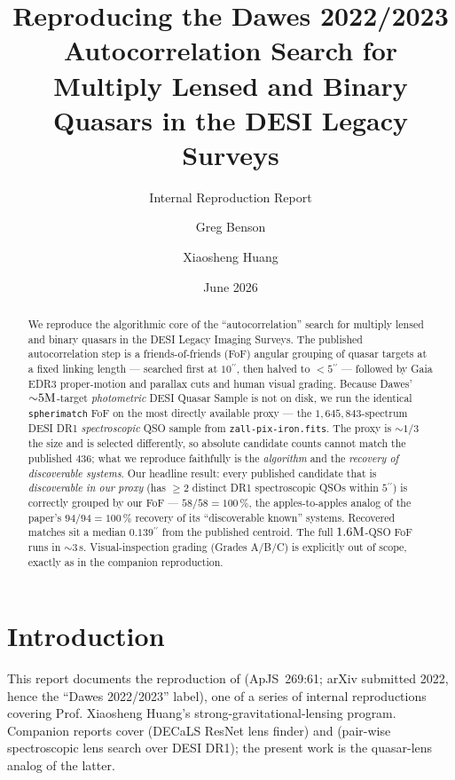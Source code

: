 \documentclass[11pt,letterpaper]{article}
\title{Reproducing the Dawes 2022/2023 Autocorrelation Search for\\
       Multiply Lensed and Binary Quasars in the DESI Legacy Surveys}
\author{Greg Benson \and Xiaosheng Huang}
\date{June 2026}
\newcommand{\asec}{\ensuremath{^{\prime\prime}}}
\begin{document}
\maketitle
\subtitle{Internal Reproduction Report}

\begin{abstract}
We reproduce the algorithmic core of the \citet{dawes2023quasars}
``autocorrelation'' search for multiply lensed and binary quasars in the
DESI Legacy Imaging Surveys. The published autocorrelation step is a
friends-of-friends (FoF) angular grouping of quasar targets at a fixed
linking length --- searched first at $10\asec$, then halved to ${<}5\asec$
--- followed by Gaia EDR3 proper-motion and parallax cuts and human visual
grading. Because Dawes' ${\sim}5{\rm M}$-target \emph{photometric} DESI Quasar
Sample is not on disk, we run the identical \texttt{spherimatch} FoF
\autocite{spherimatch} on the most directly available proxy --- the
$1{,}645{,}843$-spectrum DESI DR1 \emph{spectroscopic} QSO sample from
\texttt{zall-pix-iron.fits}. The proxy is ${\sim}1/3$ the size and is
selected differently, so absolute candidate counts cannot match the
published $436$; what we reproduce faithfully is the \emph{algorithm} and
the \emph{recovery of discoverable systems}. Our headline result: every
published candidate that is \emph{discoverable in our proxy} (has $\geq 2$
distinct DR1 spectroscopic QSOs within $5\asec$) is correctly grouped by
our FoF --- $58/58 = 100\,\%$, the apples-to-apples analog of the paper's
$94/94 = 100\,\%$ recovery of its ``discoverable known'' systems. Recovered
matches sit a median $0.139\asec$ from the published centroid. The full
$1.6{\rm M}$-QSO FoF runs in ${\sim}3$\,s. Visual-inspection grading
(Grades A/B/C) is explicitly out of scope, exactly as in the companion
\citet{hsu2025pairwise} reproduction.
\end{abstract}

\tableofcontents

\bigskip

\section{Introduction}

This report documents the reproduction of \citet{dawes2023quasars}
(ApJS~269:61; arXiv submitted 2022, hence the ``Dawes 2022/2023'' label),
one of a series of internal reproductions covering
Prof. Xiaosheng Huang's strong-gravitational-lensing program. Companion
reports cover \citet{huang2020decals} (DECaLS ResNet lens finder) and
\citet{hsu2025pairwise} (pair-wise spectroscopic lens search over DESI
DR1); the present work is the quasar-lens analog of the latter.
\end{document}
